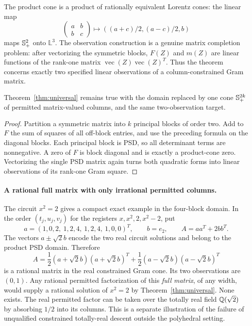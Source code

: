 The product cone is a product of rationally equivalent Lorentz cones: the linear map
\[
 \begin{pmatrix}a&b\\b&c\end{pmatrix}
 \longmapsto ((a+c)/2,(a-c)/2,b)
\]
maps $\mathbb S_+^2$ onto $\mathbb L^3$. The observation construction is a genuine matrix completion problem: after vectorizing the symmetric blocks, $F(Z)$ and $m(Z)$ are linear functions of the rank-one matrix $\operatorname{vec}(Z)\operatorname{vec}(Z)^T$. Thus the theorem concerns exactly two specified linear observations of a column-constrained Gram matrix.

\begin{corollary}
Theorem~\ref{thm:universal} remains true with the domain replaced by one cone $\mathbb S_+^{2k}$ of permitted matrix-valued columns, and the same two-observation target.
\end{corollary}
\begin{proof}
Partition a symmetric matrix into $k$ principal blocks of order two. Add to $F$ the sum of squares of all off-block entries, and use the preceding formula on the diagonal blocks. Each principal block is PSD, so all determinant terms are nonnegative. A zero of $F$ is block diagonal and is exactly a product-cone zero. Vectorizing the single PSD matrix again turns both quadratic forms into linear observations of its rank-one Gram square.
\end{proof}

\paragraph{A rational full matrix with only irrational permitted columns.}
The circuit $x^2=2$ gives a compact exact example in the four-block domain. In the order $(t_j,u_j,v_j)$ for the registers $x,x^2,2,x^2-2$, put
\[
 a=(1,0,2,\ 1,2,4,\ 1,2,4,\ 1,0,0)^T,\qquad b=e_2,
 \qquad A=aa^T+2bb^T.
\]
The vectors $a\pm\sqrt2b$ encode the two real circuit solutions and belong to the product PSD domain. Therefore
\[
 A=\frac12(a+\sqrt2b)(a+\sqrt2b)^T+
   \frac12(a-\sqrt2b)(a-\sqrt2b)^T
\]
is a rational matrix in the real constrained Gram cone. Its two observations are $(0,1)$. Any rational permitted factorization of this \emph{full matrix}, of any width, would supply a rational solution of $x^2=2$ by Theorem~\ref{thm:universal}. None exists. The real permitted factor can be taken over the totally real field $\mathbb Q(\sqrt2)$ by absorbing $1/2$ into its columns. This is a separate illustration of the failure of unqualified constrained totally-real descent outside the polyhedral setting.

